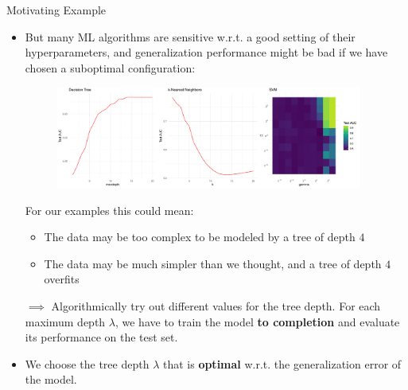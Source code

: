\begin{vbframe}{Motivating Example}
\framebreak 

\begin{itemize}
\item But many ML algorithms are sensitive w.r.t. a good setting of their hyperparameters,
  and generalization performance might be bad if we have chosen a suboptimal configuration:
  
  \begin{center}
\begin{figure}
\includegraphics[width=0.95\textwidth]{figure/tuning_importance.png}
\end{figure}
\end{center}

\framebreak
For our examples this could mean:

\begin{itemize}
\item The data may be too complex to be modeled by a tree of depth $4$ 
\item The data may be much simpler than we thought, and a tree of depth $4$ overfits
\end{itemize}
\item[$\implies$] Algorithmically try out different values for the tree depth. For each maximum depth $\lambda$, we have to train the model \textbf{to completion} and evaluate its performance on the test set. 
\item We choose the tree depth $\lambda$ that is \textbf{optimal} w.r.t. the generalization error of the model. 
\end{itemize}


\end{vbframe}


